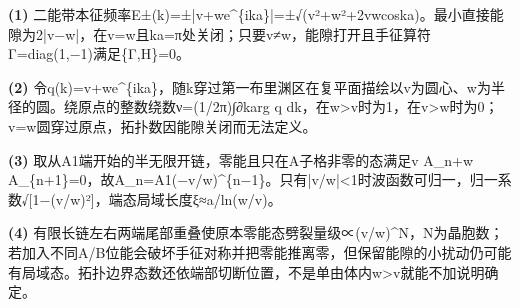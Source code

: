 \par\noindent\textbf{(1)} 二能带本征频率E±(k)=±|v+we\textasciicircum{}\{ika\}|=±√(v²+w²+2vwcoska)。最小直接能隙为2|v−w|，在v=w且ka=π处关闭；只要v≠w，能隙打开且手征算符Γ=diag(1,−1)满足\{Γ,H\}=0。
\par\noindent\textbf{(2)} 令q(k)=v+we\textasciicircum{}\{ika\}，随k穿过第一布里渊区在复平面描绘以v为圆心、w为半径的圆。绕原点的整数绕数ν=(1/2π)∫∂karg q dk，在w>v时为1，在v>w时为0；v=w圆穿过原点，拓扑数因能隙关闭而无法定义。
\par\noindent\textbf{(3)} 取从A1端开始的半无限开链，零能且只在A子格非零的态满足v A\_n+w A\_\{n+1\}=0，故A\_n=A1(−v/w)\textasciicircum{}\{n−1\}。只有|v/w|<1时波函数可归一，归一系数√[1−(v/w)²]，端态局域长度ξ≈a/ln(w/v)。
\par\noindent\textbf{(4)} 有限长链左右两端尾部重叠使原本零能态劈裂量级∝(v/w)\textasciicircum{}N，N为晶胞数；若加入不同A/B位能会破坏手征对称并把零能推离零，但保留能隙的小扰动仍可能有局域态。拓扑边界态数还依端部切断位置，不是单由体内w>v就能不加说明确定。

